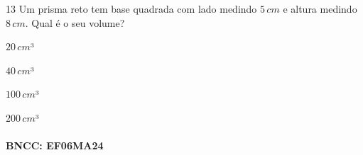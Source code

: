 {%

\num{13} Um prisma reto tem base quadrada com lado medindo $5\,cm$ e altura
medindo $8\,cm$. Qual é o seu volume?

\begin{escolha}
\item $20\,cm$³
\item $40\,cm$³
\item $100\,cm$³
\item $200\,cm$³
\end{escolha}

\paragraph{BNCC: EF06MA24 }


}
